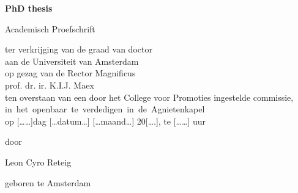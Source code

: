 
{\pagestyle{empty} 

\mbox{}\newpage
\setcounter{page}{1}

\clearpage
\par\vskip 2cm
\begin{center}
\Huge\textbf{PhD thesis} %
\par\vspace {6cm}
{\large \sc Academisch Proefschrift}
\par\vspace {1cm}
{\large ter verkrijging van de graad van doctor\\
aan de Universiteit van Amsterdam\\
op gezag van de Rector Magnificus\\
prof. dr. ir. K.I.J. Maex\\ %
ten overstaan van een door het College voor Promoties ingestelde commissie,\\
\mbox{in het openbaar te verdedigen in de Agnietenkapel}\\  %
op [……]dag […datum…] […maand…] 20[….], te [……] uur \\ } %
\par\vspace {1cm} {\large door}
\par \vspace {1cm} 
{\Large Leon Cyro Reteig} %
\par\vspace {1cm} %
{\large geboren te Amsterdam} %
\end{center}

}
